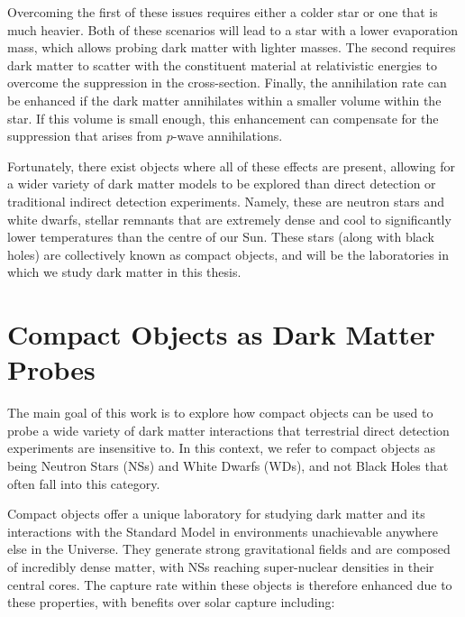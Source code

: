 Overcoming the first of these issues requires either a colder star or one that is much heavier. Both of these scenarios will lead to a star with a lower evaporation mass, which allows probing dark matter with lighter masses. The second requires dark matter to scatter with the constituent material at relativistic energies to overcome the suppression in the cross-section. 
Finally, the annihilation rate can be enhanced if the dark matter annihilates within a smaller volume within the star. If this volume is small enough, this enhancement can compensate for the suppression that arises from $p$-wave annihilations.

Fortunately, there exist objects where all of these effects are present, allowing for a wider variety of dark matter models to be explored than direct detection or traditional indirect detection experiments. Namely, these are neutron stars and white dwarfs, stellar remnants that are extremely dense and cool to significantly lower temperatures than the centre of our Sun. These stars (along with black holes) are collectively known as compact objects, and will be the laboratories in which we study dark matter in this thesis.

\section{Compact Objects as Dark Matter Probes}

The main goal of this work is to explore how compact objects can be used to probe a wide variety of dark matter interactions that terrestrial direct detection experiments are insensitive to. In this context, we refer to compact objects as being Neutron Stars (NSs) and White Dwarfs (WDs), and not Black Holes that often fall into this category.


Compact objects offer a unique laboratory for studying dark matter and its interactions with the Standard Model in environments unachievable anywhere else in the Universe. They generate strong gravitational fields and are composed of incredibly dense matter, with NSs reaching super-nuclear densities in their central cores. The capture rate within these objects is therefore enhanced due to these properties, with benefits over solar capture including:


